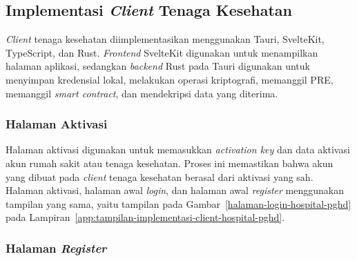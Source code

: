 \subsection{Implementasi \textit{Client} Tenaga Kesehatan}

\textit{Client} tenaga kesehatan diimplementasikan menggunakan Tauri, SvelteKit, TypeScript, dan Rust. 
\textit{Frontend} SvelteKit digunakan untuk menampilkan halaman aplikasi, sedangkan \textit{backend} Rust pada Tauri digunakan untuk menyimpan kredensial lokal, melakukan operasi kriptografi, memanggil PRE, memanggil \textit{smart contract}, dan mendekripsi data yang diterima.





\subsubsection{Halaman Aktivasi}

Halaman aktivasi digunakan untuk memasukkan \textit{activation key} dan data aktivasi akun rumah sakit atau tenaga kesehatan. 
Proses ini memastikan bahwa akun yang dibuat pada \textit{client} tenaga kesehatan berasal dari aktivasi yang sah.
Halaman aktivasi, halaman awal \textit{login}, dan halaman awal \textit{register} menggunakan tampilan yang sama, yaitu tampilan pada Gambar~\ref{halaman-login-hospital-pghd} pada Lampiran~\ref{app:tampilan-implementasi-client-hospital-pghd}.

\subsubsection{Halaman \textit{Register}}

